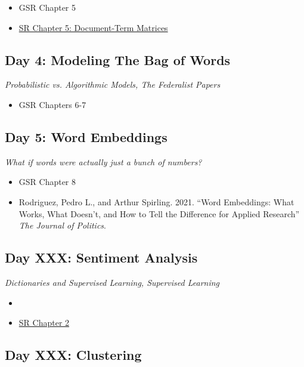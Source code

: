 \documentclass[11pt, letterpaper]{article}
\begin{document}
\begin{itemize}
	\item GSR Chapter 5
	\item \href{https://www.tidytextmining.com/dtm.html}{SR Chapter 5: Document-Term Matrices}
\end{itemize}

\subsection*{Day 4: Modeling The Bag of Words}

\textit{Probabilistic vs. Algorithmic Models, The Federalist Papers}

\begin{itemize}
	\item GSR Chapters 6-7
\end{itemize}

\subsection*{Day 5: Word Embeddings}

\textit{What if words were actually just a bunch of numbers?}

\begin{itemize}
	\item GSR Chapter 8
	\item Rodriguez, Pedro L., and Arthur Spirling. 2021. ``Word Embeddings: What Works, What Doesn’t, and How to Tell the Difference for Applied Research'' \textit{The Journal of Politics}.
\end{itemize}


\subsection*{Day XXX: Sentiment Analysis}

\textit{Dictionaries and Supervised Learning, Supervised Learning}

\begin{itemize}
	\item \item \href{https://www.tidytextmining.com/sentiment.html}{SR Chapter 2}
\end{itemize}

\subsection*{Day XXX: Clustering}
\end{document}
